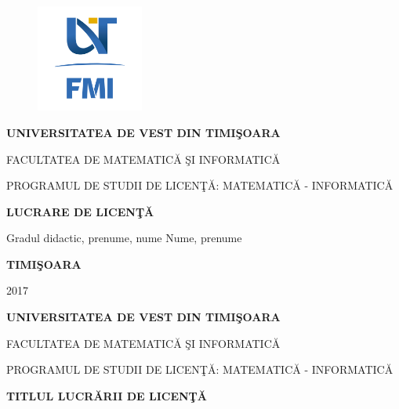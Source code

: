 \documentclass[12pt,a4paper]{report}
\theoremstyle{definition}
\theoremstyle{remark}
\begin{document}
\thispagestyle{empty}
\begin{center}
\begin{figure}[h!]
\vspace{-20pt}
\begin{center}
\includegraphics[width=100pt]{FMI-03.png}
\end{center}
\end{figure}


{\large{\bf UNIVERSITATEA DE VEST DIN TIMI\c SOARA

FACULTATEA DE MATEMATIC\u A \c SI INFORMATIC\u A

PROGRAMUL DE STUDII DE LICEN\c T\u A: MATEMATIC\u A - INFORMATIC\u A}}

\vspace{120pt}
{\huge {\bf LUCRARE DE LICEN\c T\u A}}

\vspace{160pt}
\end{center}

{\large{}

\noindent Gradul didactic, prenume, nume \hspace{73pt} Nume, prenume}

\vspace{160pt}
\begin{center}
{\bf TIMI\c SOARA

2017}
\end{center}
\newpage
\thispagestyle{empty}
\begin{center}
{\large{\bf UNIVERSITATEA DE VEST DIN TIMI\c SOARA

FACULTATEA DE MATEMATIC\u A \c SI INFORMATIC\u A

PROGRAMUL DE STUDII DE LICEN\c T\u A: MATEMATIC\u A - INFORMATIC\u A}}

\vspace{200pt}
{\huge {\bf TITLUL LUCR\u ARII DE LICEN\c T\u A }}%

\vspace{153pt}
\end{center}
\end{document}
